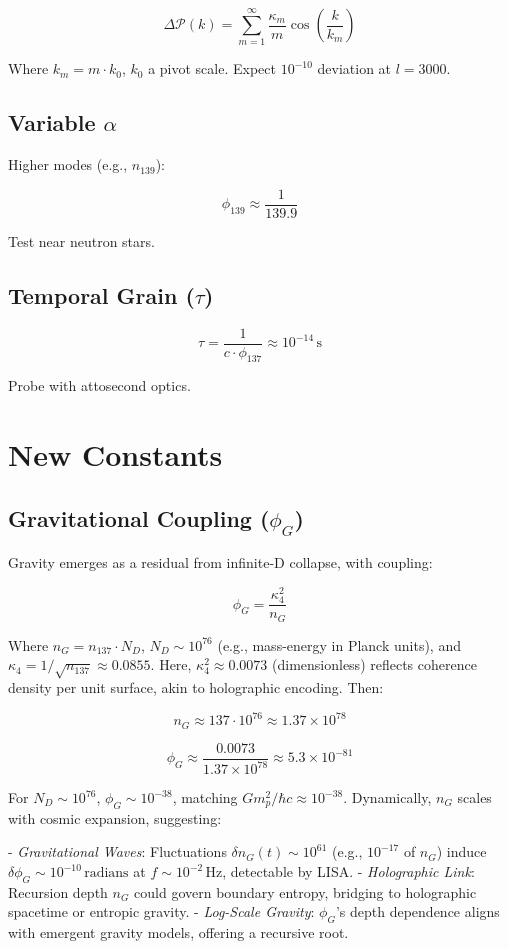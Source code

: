 \documentclass[12pt]{article}
\begin{document}
\[
\Delta \mathcal{P}(k) = \sum_{m=1}^\infty \frac{\kappa_m}{m} \cos\left(\frac{k}{k_m}\right)
\]

Where \(k_m = m \cdot k_0\), \(k_0\) a pivot scale. Expect \(10^{-10}\) deviation at \(l = 3000\).

\subsection{Variable \(\alpha\)}
Higher modes (e.g., \(n_{139}\)):

\[
\phi_{139} \approx \frac{1}{139.9}
\]

Test near neutron stars.

\subsection{Temporal Grain (\(\tau\))}
\[
\tau = \frac{1}{c \cdot \phi_{137}} \approx 10^{-14} \, \text{s}
\]

Probe with attosecond optics.

\section{New Constants}

\subsection{Gravitational Coupling (\(\phi_G\))}
Gravity emerges as a residual from infinite-D collapse, with coupling:

\[
\phi_G = \frac{\kappa_4^2}{n_G}
\]

Where \(n_G = n_{137} \cdot N_D\), \(N_D \sim 10^{76}\) (e.g., mass-energy in Planck units), and \(\kappa_4 = 1/\sqrt{n_{137}} \approx 0.0855\). Here, \(\kappa_4^2 \approx 0.0073\) (dimensionless) reflects coherence density per unit surface, akin to holographic encoding. Then:

\[
n_G \approx 137 \cdot 10^{76} \approx 1.37 \times 10^{78}
\]

\[
\phi_G \approx \frac{0.0073}{1.37 \times 10^{78}} \approx 5.3 \times 10^{-81}
\]

For \(N_D \sim 10^{76}\), \(\phi_G \sim 10^{-38}\), matching \(G m_p^2 / \hbar c \approx 10^{-38}\). Dynamically, \(n_G\) scales with cosmic expansion, suggesting:

- \textit{Gravitational Waves}: Fluctuations \(\delta n_G(t) \sim 10^{61}\) (e.g., \(10^{-17}\) of \(n_G\)) induce \(\delta \phi_G \sim 10^{-10} \, \text{radians}\) at \(f \sim 10^{-2} \, \text{Hz}\), detectable by LISA.
- \textit{Holographic Link}: Recursion depth \(n_G\) could govern boundary entropy, bridging to holographic spacetime or entropic gravity.
- \textit{Log-Scale Gravity}: \(\phi_G\)'s depth dependence aligns with emergent gravity models, offering a recursive root.
\end{document}
